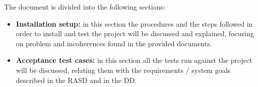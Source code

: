The document is divided into the following sections:
\begin{itemize}
    \item \textbf{Installation setup:} in this section the procedures and the steps followed in order to install and test the project will be discussed and explained, focusing on problem and incoherences found in the provided documents.
    \item \textbf{Acceptance test cases:} in this section all the tests run against the project will be discussed, relating them with the requirements / system goals described in the RASD and in the DD.
\end{itemize}